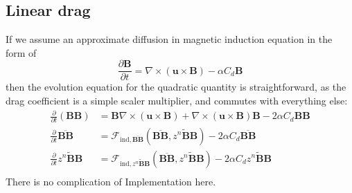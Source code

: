 \subsection{Linear drag}


If we assume an approximate diffusion in magnetic induction equation in the form of
\[
    \frac{\partial \mathbf{B}}{\partial t} = \nabla\times (\mathbf{u}\times \mathbf{B}) - \alpha C_d \mathbf{B}
\]
then the evolution equation for the quadratic quantity is straightforward, as the drag coefficient is a simple scaler multiplier, and commutes with everything else:
\[\begin{aligned}
    \frac{\partial}{\partial t} \left(\mathbf{B} \mathbf{B}\right) &= \mathbf{B}\nabla\times (\mathbf{u}\times \mathbf{B}) + \nabla\times (\mathbf{u}\times \mathbf{B}) \mathbf{B} - 2 \alpha C_d \mathbf{B} \mathbf{B} \\ 
    \frac{\partial}{\partial t} \overline{\mathbf{B} \mathbf{B}} &= \mathcal{F}_{\mathrm{ind}, \overline{\mathbf{B} \mathbf{B}}} (\overline{\mathbf{B} \mathbf{B}}, \widetilde{z^n \mathbf{B} \mathbf{B}}) - 2 \alpha C_d \overline{\mathbf{B} \mathbf{B}} \\ 
    \frac{\partial}{\partial t} \widetilde{z^n \mathbf{B} \mathbf{B}} &= \mathcal{F}_{\mathrm{ind}, \widetilde{z^n \mathbf{B} \mathbf{B}}} (\overline{\mathbf{B} \mathbf{B}}, \widetilde{z^n \mathbf{B} \mathbf{B}}) - 2 \alpha C_d \widetilde{z^n \mathbf{B} \mathbf{B}} \\ 
\end{aligned}\]
There is no complication of Implementation here.


